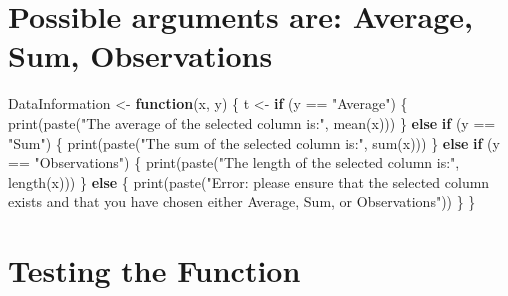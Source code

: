 \documentclass[
]{article}
\newenvironment{Shaded}{\begin{snugshade}}{\end{snugshade}}
\newcommand{\ControlFlowTok}[1]{\textcolor[rgb]{0.13,0.29,0.53}{\textbf{#1}}}
\newcommand{\FunctionTok}[1]{\textcolor[rgb]{0.00,0.00,0.00}{#1}}
\newcommand{\NormalTok}[1]{#1}
\newcommand{\OtherTok}[1]{\textcolor[rgb]{0.56,0.35,0.01}{#1}}
\newcommand{\SpecialCharTok}[1]{\textcolor[rgb]{0.00,0.00,0.00}{#1}}
\newcommand{\StringTok}[1]{\textcolor[rgb]{0.31,0.60,0.02}{#1}}
\begin{document}
\hypertarget{possible-arguments-are-average-sum-observations}{%
\section{Possible arguments are: Average, Sum,
Observations}\label{possible-arguments-are-average-sum-observations}}

\begin{Shaded}
\begin{Highlighting}[]
\NormalTok{DataInformation }\OtherTok{\textless{}{-}} \ControlFlowTok{function}\NormalTok{(x, y) \{}
\NormalTok{  t }\OtherTok{\textless{}{-}} \ControlFlowTok{if}\NormalTok{ (y }\SpecialCharTok{==} \StringTok{"Average"}\NormalTok{) \{}
    \FunctionTok{print}\NormalTok{(}\FunctionTok{paste}\NormalTok{(}\StringTok{"The average of the selected column is:"}\NormalTok{, }\FunctionTok{mean}\NormalTok{(x)))}
\NormalTok{  \} }\ControlFlowTok{else} \ControlFlowTok{if}\NormalTok{ (y }\SpecialCharTok{==} \StringTok{"Sum"}\NormalTok{) \{}
    \FunctionTok{print}\NormalTok{(}\FunctionTok{paste}\NormalTok{(}\StringTok{"The sum of the selected column is:"}\NormalTok{, }\FunctionTok{sum}\NormalTok{(x)))}
\NormalTok{  \} }\ControlFlowTok{else} \ControlFlowTok{if}\NormalTok{ (y }\SpecialCharTok{==} \StringTok{"Observations"}\NormalTok{) \{}
    \FunctionTok{print}\NormalTok{(}\FunctionTok{paste}\NormalTok{(}\StringTok{"The length of the selected column is:"}\NormalTok{, }\FunctionTok{length}\NormalTok{(x)))}
\NormalTok{  \} }\ControlFlowTok{else}\NormalTok{ \{}
    \FunctionTok{print}\NormalTok{(}\FunctionTok{paste}\NormalTok{(}\StringTok{"Error: please ensure that the selected column exists and that you have chosen either Average, Sum, or Observations"}\NormalTok{))}
\NormalTok{  \}}
\NormalTok{\}}
\end{Highlighting}
\end{Shaded}

\hypertarget{testing-the-function}{%
\section{Testing the Function}\label{testing-the-function}}

\begin{Shaded}
\end{Shaded}
\end{document}
